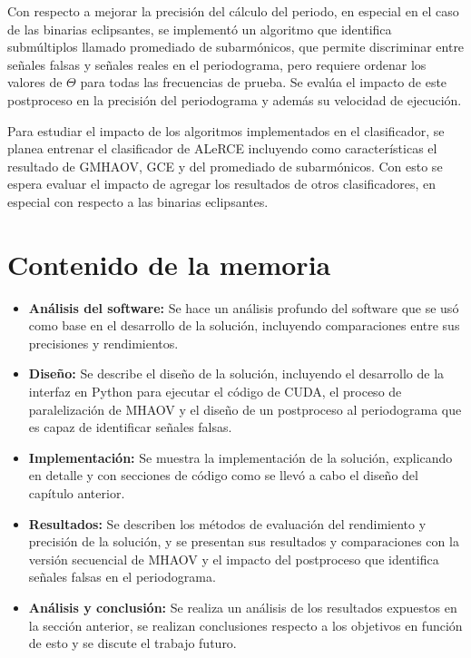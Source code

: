 Con respecto a mejorar la precisión del cálculo del periodo, en especial en el caso de las binarias eclipsantes, se implementó un algoritmo que identifica submúltiplos llamado promediado de subarmónicos, que permite discriminar entre señales falsas y señales reales en el periodograma, pero requiere ordenar los valores de $\Theta$ para todas las frecuencias de prueba. Se evalúa el impacto de este postproceso en la precisión del periodograma y además su velocidad de ejecución.

Para estudiar el impacto de los algoritmos implementados en el clasificador, se planea entrenar el clasificador de ALeRCE incluyendo como características el resultado de GMHAOV, GCE y del promediado de subarmónicos. Con esto se espera evaluar el impacto de agregar los resultados de otros clasificadores, en especial con respecto a las binarias eclipsantes.

\section{Contenido de la memoria}\label{chap:contenido}
\begin{itemize}
    \item {\bf Análisis del software:} Se hace un análisis profundo del software que se usó como base en el desarrollo de la solución, incluyendo comparaciones entre sus precisiones y rendimientos. 
    \item {\bf Diseño:} Se describe el diseño de la solución, incluyendo el desarrollo de la interfaz en Python para ejecutar el código de CUDA, el proceso de paralelización de MHAOV y el diseño de un postproceso al periodograma que es capaz de identificar señales falsas.
    \item {\bf Implementación:} Se muestra la implementación de la solución, explicando en detalle y con secciones de código como se llevó a cabo el diseño del capítulo anterior.
    \item {\bf Resultados:} Se describen los métodos de evaluación del rendimiento y precisión de la solución, y se presentan sus resultados y comparaciones con la versión secuencial de MHAOV y el impacto del postproceso que identifica señales falsas en el periodograma.
    \item {\bf Análisis y conclusión:} Se realiza un análisis de los resultados expuestos en la sección anterior, se realizan conclusiones respecto a los objetivos en función de esto y se discute el trabajo futuro.
\end{itemize}

